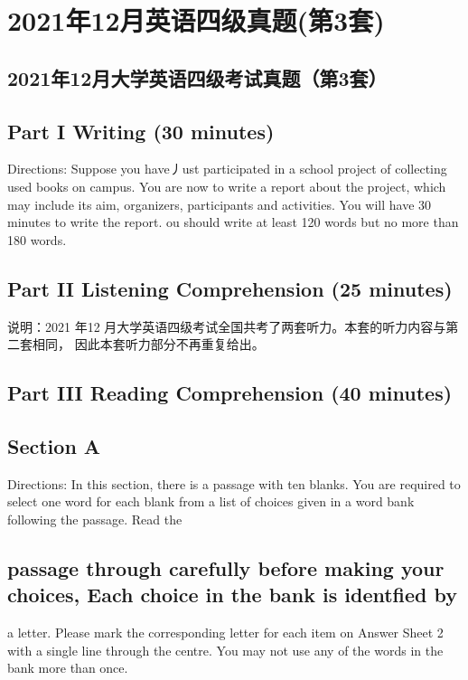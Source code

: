 \documentclass[UTF8,11pt]{ctexart}
\begin{document}
\section*{2021年12月英语四级真题(第3套)}
\subsection*{\textbf{2021年12月大学英语四级考试真题（第3套）}}


\subsection*{Part I Writing (30 minutes)}


Directions: Suppose you have丿ust participated in a school project of collecting used books on campus. You are now to write a report about the project, which may include its aim, organizers, participants and activities. You will have 30 minutes to write the report. ou should write at least 120 words but no more than 180 words.


\subsection*{Part II Listening Comprehension (25 minutes)}


说明：2021 年12 月大学英语四级考试全国共考了两套听力。本套的听力内容与第二套相同， 因此本套听力部分不再重复给出。


\subsection*{Part III Reading Comprehension (40 minutes)}


\subsection*{Section A}


Directions: In this section, there is a passage with ten blanks. You are required to select one word for each blank from a list of choices given in a word bank following the passage. Read the


\subsection*{passage through carefully before making your choices, Each choice in the bank is identfied by}


a letter. Please mark the corresponding letter for each item on Answer Sheet 2 with a single line through the centre. You may not use any of the words in the bank more than once.
\end{document}
